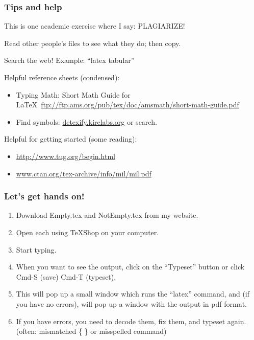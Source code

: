 \documentclass{beamer}  %
\newcommand{\med}{\medskip}  %
\begin{document}
\frame
{
\frametitle{Tips and help}

This is one academic exercise where I say: PLAGIARIZE!

Read other people's files to see what they do; then copy.

\med
Search the web!  Example: ``latex tabular''

\med
Helpful reference sheets (condensed):
\begin{itemize}
\item Typing Math: Short Math Guide for \LaTeX\ {\small \url{ftp://ftp.ams.org/pub/tex/doc/amsmath/short-math-guide.pdf}}
\item Find symbols: \url{detexify.kirelabs.org}  or search.
\end{itemize}

\med
Helpful for getting started (some reading):
\begin{itemize}
\item \url{http://www.tug.org/begin.html}
\item \url{www.ctan.org/tex-archive/info/mil/mil.pdf}
\end{itemize}

\vspace{.5in}
}

\frame
{
\frametitle{Let's get hands on!}

\begin{enumerate}
\item Download Empty.tex and NotEmpty.tex from my website.

\item Open each using TeXShop on your computer.

\item Start typing.

\item When you want to see the output, click on the ``Typeset'' button or click Cmd-S (save) Cmd-T (typeset).  

\item This will pop up a small window which runs the ``latex'' command, and (if you have no errors), will pop up a window with the output in pdf format.

\item If you have errors, you need to decode them, fix them, and typeset again.  (often: mismatched \{ \} or misspelled command)\!\!\!\!
\end{enumerate}

\vspace{.5in}

}
\end{document}
